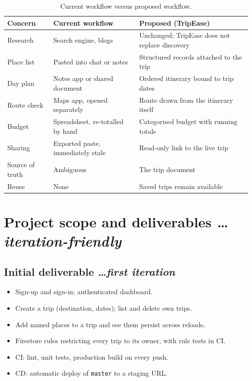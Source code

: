 \documentclass[11pt,a4paper]{article}
\newcommand{\BvrHint}[1]{%
  {\normalfont\normalsize\itshape\hfill #1}}
\begin{document}
\begin{table}[htbp]
\centering
\footnotesize
\caption{Current workflow versus proposed workflow.}
\label{tab:compare}
\begin{tabularx}{\textwidth}{@{}l X X@{}}
\toprule
\textbf{Concern} & \textbf{Current workflow} & \textbf{Proposed (TripEase)} \\
\midrule
Research & Search engine, blogs & Unchanged; TripEase does not replace discovery \\
Place list & Pasted into chat or notes & Structured records attached to the trip \\
Day plan & Notes app or shared document & Ordered itinerary bound to trip dates \\
Route check & Maps app, opened separately & Route drawn from the itinerary itself \\
Budget & Spreadsheet, re-totalled by hand & Categorised budget with running totals \\
Sharing & Exported paste, immediately stale & Read-only link to the live trip \\
Source of truth & Ambiguous & The trip document \\
Reuse & None & Saved trips remain available \\
\bottomrule
\end{tabularx}
\end{table}

\section{Project scope and deliverables %
\BvrHint{\ldots iteration-friendly}}
\label{sec:scope}

\subsection{Initial deliverable %
\BvrHint{\ldots first iteration}}
\begin{itemize}[leftmargin=0.7cm]
    \item Sign-up and sign-in; authenticated dashboard.
    \item Create a trip (destination, dates); list and
      delete own trips.
    \item Add named places to a trip and see them
      persist across reloads.
    \item Firestore rules restricting every trip to its
      owner, with rule tests in CI.
    \item CI: lint, unit tests, production build on
      every push.
    \item CD: automatic deploy of \texttt{master} to a
      staging URL.
\end{itemize}
\end{document}
